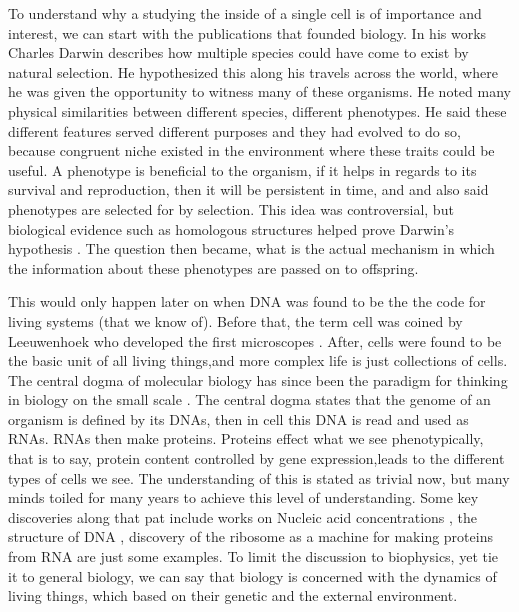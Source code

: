 \documentclass[a4paper,11pt,oneside]{book}
\begin{document}
To understand why a studying the inside of a single cell is of importance and interest, we can start with the publications that founded biology. In his works  Charles Darwin describes how multiple species could have come to exist by natural selection. He hypothesized this along his travels across the world, where he was given the opportunity to witness many of these organisms. He noted many physical similarities between different species, different phenotypes. He said these different features served different purposes and they had evolved to do so, because congruent niche existed in the environment where these traits could be useful. A phenotype is beneficial to the organism, if it helps in regards to its survival and reproduction, then it will be persistent in time, and and also said phenotypes are selected for by selection. This idea was controversial, but biological evidence such as homologous structures helped prove Darwin's hypothesis . The question then became, what is the actual mechanism in which the information about these phenotypes are passed on to offspring.

This would only happen later on when DNA was found to be the the code for living systems (that we know of). Before that, the term cell was coined by Leeuwenhoek who developed the first microscopes . After, cells were found to be the basic unit of all living things,and more complex life is just collections of cells. The central dogma of molecular biology has since been the paradigm for thinking in biology on the small scale . The central dogma states that the genome of an organism is defined by its DNAs, then in cell this DNA is read and used as RNAs. RNAs then make proteins. Proteins effect what we see phenotypically, that is to say, protein content controlled by gene expression,leads to the different types of cells we see. The understanding of this is stated as trivial now, but many minds toiled for many years to achieve this level of understanding. Some key discoveries along that pat include works on Nucleic acid concentrations , the structure of DNA , discovery of the ribosome as a machine for making proteins from RNA are just some examples. To limit the discussion to biophysics, yet tie it to general biology, we can say that biology is concerned with the dynamics of living things, which based on their genetic and the external environment.
\end{document}
